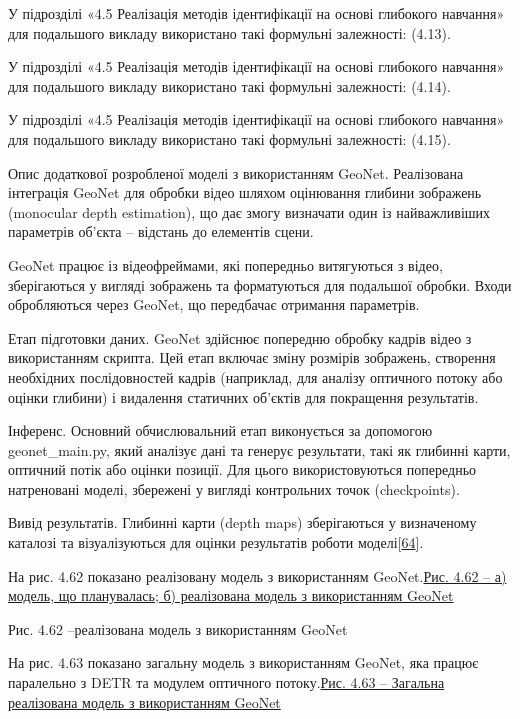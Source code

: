 \documentclass[
]{article}
\begin{document}
У підрозділі «4.5 Реалізація методів ідентифікації на основі глибокого навчання» для подальшого викладу використано такі формульні залежності: (4.13).

У підрозділі «4.5 Реалізація методів ідентифікації на основі глибокого навчання» для подальшого викладу використано такі формульні залежності: (4.14).

У підрозділі «4.5 Реалізація методів ідентифікації на основі глибокого навчання» для подальшого викладу використано такі формульні залежності: (4.15).

Опис додаткової розробленої моделі з використанням GeoNet. Реалізована інтеграція GeoNet для обробки відео шляхом оцінювання глибини зображень (monocular depth estimation), що дає змогу визначати один із найважливіших параметрів об'єкта -- відстань до елементів сцени.

GeoNet працює із відеофреймами, які попередньо витягуються з відео, зберігаються у вигляді зображень та форматуються для подальшої обробки. Входи обробляються через GeoNet, що передбачає отримання параметрів.

Етап підготовки даних. GeoNet здійснює попередню обробку кадрів відео з використанням скрипта. Цей етап включає зміну розмірів зображень, створення необхідних послідовностей кадрів (наприклад, для аналізу оптичного потоку або оцінки глибини) і видалення статичних об'єктів для покращення результатів.

Інференс. Основний обчислювальний етап виконується за допомогою geonet\_main.py, який аналізує дані та генерує результати, такі як глибинні карти, оптичний потік або оцінки позиції. Для цього використовуються попередньо натреновані моделі, збережені у вигляді контрольних точок (checkpoints).

Вивід результатів. Глибинні карти (depth maps) зберігаються у визначеному каталозі та візуалізуються для оцінки результатів роботи моделі{[}\hyperref[_Ref221389746]{64}{]}.

На рис. 4.62 показано реалізовану модель з використанням GeoNet.\hyperref[_Ref221383624]{Рис. 4.62 -- а) модель, що планувалась; б) реалізована модель з використанням GeoNet}

\protect{}\label{_Ref221383624}{}Рис. 4.62 --реалізована модель з використанням GeoNet

На рис. 4.63 показано загальну модель з використанням GeoNet, яка працює паралельно з DETR та модулем оптичного потоку.\hyperref[_Ref221383821]{Рис. 4.63 -- Загальна реалізована модель з використанням GeoNet}
\end{document}

